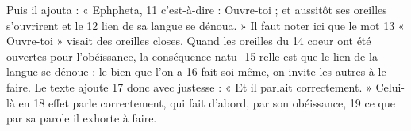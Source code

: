 Puis il ajouta : « Ephpheta,	 
11	 	c'est-à-dire : Ouvre-toi ; et aussitôt ses oreilles s'ouvrirent et le	 
12	 	lien de sa langue se dénoua. » Il faut noter ici que le mot	 
13	 	« Ouvre-toi » visait des oreilles closes. Quand les oreilles du	 
14	 	coeur ont été ouvertes pour l'obéissance, la conséquence natu-	 
15	 	relle est que le lien de la langue se dénoue : le bien que l'on a	 
16	 	fait soi-même, on invite les autres à le faire. Le texte ajoute	 
17	 	donc avec justesse : « Et il parlait correctement. » Celui-là en	 
18	 	effet parle correctement, qui fait d'abord, par son obéissance,	 
19	 	ce que par sa parole il exhorte à faire.